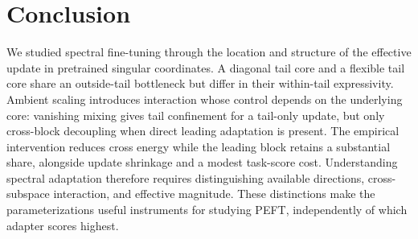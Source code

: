 \section{Conclusion}
\label{sec:conclusion}
We studied spectral fine-tuning through the location and structure of the effective update in pretrained singular coordinates. A diagonal tail core and a flexible tail core share an outside-tail bottleneck but differ in their within-tail expressivity. Ambient scaling introduces interaction whose control depends on the underlying core: vanishing mixing gives tail confinement for a tail-only update, but only cross-block decoupling when direct leading adaptation is present. The empirical intervention reduces cross energy while the leading block retains a substantial share, alongside update shrinkage and a modest task-score cost. Understanding spectral adaptation therefore requires distinguishing available directions, cross-subspace interaction, and effective magnitude. These distinctions make the parameterizations useful instruments for studying PEFT, independently of which adapter scores highest.
